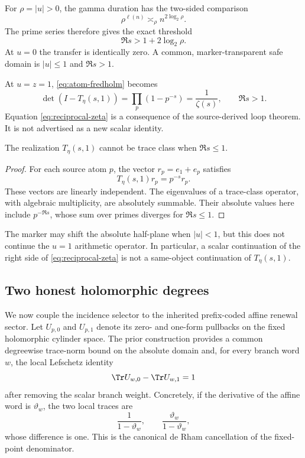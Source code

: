 For \(\rho=|u|>0\), the gamma duration has the two-sided comparison
\begin{equation}
\rho^{\ell(n)}
\asymp_\rho n^{2\log_2\rho}.
\label{eq:gamma-asymptotic}
\end{equation}
The prime series therefore gives the exact threshold
\begin{equation}
\Re s>1+2\log_2\rho.
\label{eq:marker-half-plane}
\end{equation}
At \(u=0\) the transfer is identically zero. A common, marker-transparent safe
domain is \(|u|\le1\) and \(\Re s>1\).

At \(u=z=1\), \eqref{eq:atom-fredholm} becomes
\begin{equation}
\det(I-T_\eta(s,1))
=\prod_p(1-p^{-s})
=\frac1{\zeta(s)},
\qquad \Re s>1.
\label{eq:reciprocal-zeta}
\end{equation}
Equation \eqref{eq:reciprocal-zeta} is a consequence of the source-derived
loop theorem. It is not advertised as a new scalar identity.

\begin{proposition}[Sharp \(u=1\) trace-class barrier]
\label{prop:trace-barrier}
The realization \(T_\eta(s,1)\) cannot be trace class when \(\Re s\le1\).
\end{proposition}

\begin{proof}
For each source atom \(p\), the vector \(r_p=e_1+e_p\) satisfies
\[
T_\eta(s,1)r_p=p^{-s}r_p.
\]
These vectors are linearly independent. The eigenvalues of a trace-class
operator, with algebraic multiplicity, are absolutely summable. Their
absolute values here include \(p^{-\Re s}\), whose sum over primes diverges
for \(\Re s\le1\).
\end{proof}

The marker may shift the absolute half-plane when \(|u|<1\), but this does
not continue the \(u=1\) arithmetic operator. In particular, a scalar
continuation of the right side of \eqref{eq:reciprocal-zeta} is not a
same-object continuation of \(T_\eta(s,1)\).

\subsection{Two honest holomorphic degrees}

We now couple the incidence selector to the inherited prefix-coded affine
renewal sector. Let \(U_{p,0}\) and \(U_{p,1}\) denote its zero- and one-form
pullbacks on the fixed holomorphic cylinder space. The prior construction
provides a common degreewise trace-norm bound on the absolute domain and, for
every branch word \(w\), the local Lefschetz identity
\begin{equation}
\Tr U_{w,0}-\Tr U_{w,1}=1
\label{eq:local-lefschetz}
\end{equation}
after removing the scalar branch weight. Concretely, if the derivative of the
affine word is \(\vartheta_w\), the two local traces are
\[
\frac1{1-\vartheta_w},
\qquad
\frac{\vartheta_w}{1-\vartheta_w},
\]
whose difference is one. This is the canonical de Rham cancellation of the
fixed-point denominator.

